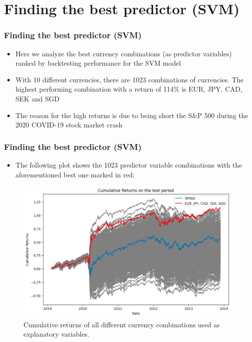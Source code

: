 \documentclass{beamer}
\begin{document}
\section{Finding the best predictor (SVM)}
\begin{frame}
\frametitle{Finding the best predictor (SVM)}
\begin{itemize}
    \item Here we analyze the best currency combinations (as predictor variables) ranked by backtesting performance for the SVM model
    \item With 10 different currencies, there are 1023 combinations of currencies. The highest performing combination with a return of 114\% is EUR, JPY, CAD, SEK and SGD
    \item The reason for the high returns is due to being short the S\&P 500 during the 2020 COVID-19 stock market crash
    
\end{itemize}
\end{frame}

\begin{frame}
\frametitle{Finding the best predictor (SVM)}
\begin{itemize}
    \item The following plot shows the 1023 predictor variable combinations with the aforementioned best one marked in red:
\end{itemize}
\begin{figure}[h!]
\begin{center}
  \includegraphics[width=0.6\columnwidth]{images/best_predictor.png}
  \caption{Cumulative returns of all different currency combinations used as explanatory variables.}
\end{center}
  \label{fig: cumulative returns}
\end{figure}
\end{frame}
\end{document}
